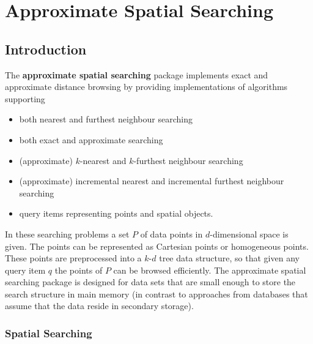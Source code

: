 \chapter{Approximate Spatial Searching}

\section{Introduction}

The {\bf approximate spatial searching} package implements
exact and approximate distance browsing
by providing implementations of algorithms supporting

\begin{itemize} 

\item
both nearest and furthest neighbour searching

\item
both exact and approximate searching

\item 
(approximate) $k$-nearest and $k$-furthest neighbour searching

\item 
(approximate) incremental nearest and incremental furthest neighbour searching

\item
query items representing points and spatial objects.

\end{itemize}

In these searching problems a set $P$ of data points in $d$-dimensional
space is given.
The points can be represented as Cartesian points or homogeneous points.
These points are preprocessed into a $k$-$d$ tree data structure, so that given
any query item $q$ the points of $P$ can be browsed efficiently.
The approximate spatial searching package is designed for data sets that are small enough to store
the search structure in main memory (in contrast to approaches
from databases that assume that the data reside in secondary storage).

\subsection{Spatial Searching}


